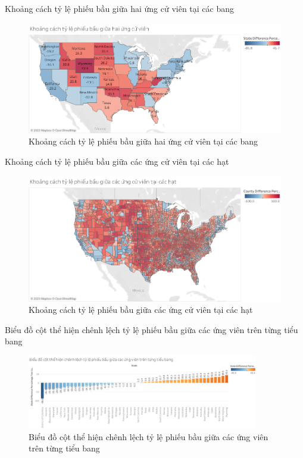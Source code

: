 \documentclass[10pt]{beamer}
\theoremstyle{remark}
\theoremstyle{definition}
\begin{document}
\begin{frame}{Khoảng cách tỷ lệ phiếu bầu giữa hai ứng cử viên tại các bang}
	\begin{figure}[h!]
        \centering
        \includegraphics[width=\textwidth]{figures/State_Difference_Percentage_Total_Vote_Two_Candidate.png}
        \caption{Khoảng cách tỷ lệ phiếu bầu giữa hai ứng cử viên tại các bang}
    \end{figure}
\end{frame}

\begin{frame}{Khoảng cách tỷ lệ phiếu bầu giữa các ứng cử viên tại các hạt}
	\begin{figure}[h!]
        \centering
        \includegraphics[width=\textwidth]{figures/County_Difference_Percentage_Total_Vote_Two_Candidate.png}
        \caption{Khoảng cách tỷ lệ phiếu bầu giữa các ứng cử viên tại các hạt}
    \end{figure}
\end{frame}



\begin{frame}{Biểu đồ cột thể hiện chênh lệch tỷ lệ phiếu bầu giữa các ứng viên trên từng tiểu bang}
	\begin{figure}[h!]
		\centering
		\includegraphics[width=0.9\textwidth]{figures/State_Difference_Percentage_Total_Vote_Two_Candidate_Bar_Chart.png}
		\caption{Biểu đồ cột thể hiện chênh lệch tỷ lệ phiếu bầu giữa các ứng viên trên từng tiểu bang}
	\end{figure}
\end{frame}
\end{document}
